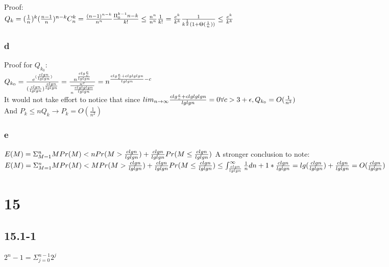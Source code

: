 \documentclass[]{article}
\begin{document}
Proof:\\
$Q_k = (\frac{1}{n})^k(\frac{n-1}{n})^{n-k}C_{n}^{k} \\
= \frac{(n-1)^{n-k}}{n^n} \frac{\Pi_{0}^{k-1}n-k}{k!} \\
\le \frac{n^n}{n^n} \frac{1}{k!}\\
= \frac{e^k}{k^k} \frac{1}{k^{\frac{1}{2}} (1+\Theta(\frac{1}{n}))}\\
\le \frac{e^k}{k^k}$

\subsubsection{d}

Proof for $Q_{k_{0}}$: \\
$Q_{k_{0}} = \frac{e^{(\frac{clgn}{lglgn})}}{(\frac{clgn}{lglgn}) ^ {\frac{clgn}{lglgn}}}\\
= \frac{n^{\frac{clg\frac{e}{c}}{lglgn}}}{\frac{n^c}{n^{\frac{clglglgn}{lglgn}}}} = n^{\frac{clg\frac{e}{c} + clglglgn}{lglgn} - c}$\\
It would not take effort to notice that since ${lim}_{n\to \infty}\frac{clg\frac{e}{c} + clglglgn}{lglgn} =0\\
\forall c > 3+\epsilon, Q_{k_{0}} = O(\frac{1}{n^3}) $\\
And $P_{k} \le nQ_{k} \rightarrow P_{k} = O(\frac{1}{n^2})$

\subsubsection{e}

$E(M) = \Sigma_{M = 1}^{n} M Pr(M) < nPr(M>\frac{clgn}{lglgn}) + \frac{clgn}{lglgn}Pr(M \le \frac{clgn}{lglgn})\\$
A stronger conclusion to note: \\
$E(M) = \Sigma_{M = 1}^{n} M Pr(M) < MPr(M>\frac{clgn}{lglgn}) + \frac{clgn}{lglgn}Pr(M \le \frac{clgn}{lglgn})\\
\le \int_{\frac{clgn}{lglgn}}^{\infty}\frac{1}{n}dn + 1*\frac{clgn}{lglgn} \\
= lg (\frac{clgn}{lglgn}) + \frac{clgn}{lglgn}\\ = O(\frac{clgn}{lglgn})$

\section{15}

\subsection{15.1-1}
$2^n -1 = \Sigma_{j = 0}^{n-1} 2^j $
\end{document}
